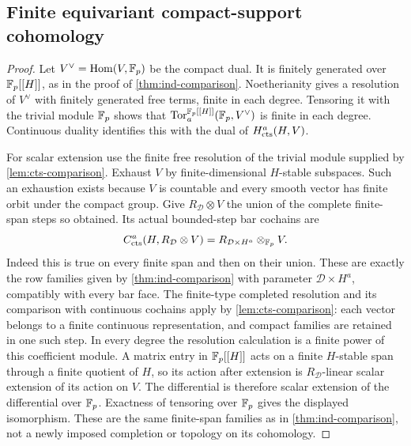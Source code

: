 \subsection{Finite equivariant compact-support cohomology}


\begin{proof}
Let $V^\vee=\operatorname{Hom}(V,\mathbb F_p)$ be the compact dual.  It is
finitely generated over $\mathbb F_p[[H]]$, as in the proof of
\cref{thm:ind-comparison}.  Noetherianity gives a resolution
of $V^\vee$ with finitely generated free terms, finite in
each degree.  Tensoring it with the trivial module $\mathbb F_p$
shows that $\operatorname{Tor}_a^{\mathbb F_p[[H]]}(\mathbb F_p,V^\vee)$ is finite in
each degree.  Continuous duality identifies this with the
dual of $H^a_{\mathrm{cts}}(H,V)$.

For scalar extension use the finite free resolution of the
trivial module supplied by \cref{lem:cts-comparison}.
Exhaust $V$ by finite-dimensional $H$-stable subspaces.
Such an exhaustion exists because
$V$ is countable and every smooth vector has finite orbit
under the compact group.  Give
$R_{\mathcal D}\otimes V$ the union of the complete
finite-span steps so obtained.  Its actual bounded-step
bar cochains are
\[
 C^a_{\mathrm{cts}}(H,R_{\mathcal D}\otimes V)
   =R_{\mathcal D\times H^a}\otimes_{\mathbb F_p}V.
\]
Indeed this is true on every finite span and then on their
union.  These are exactly the row families given by
\cref{thm:ind-comparison} with parameter
$\mathcal D\times H^a$, compatibly with every bar face.
The finite-type completed
resolution and its comparison with continuous cochains
apply by \cref{lem:cts-comparison}: each vector belongs to
a finite continuous representation, and compact families
are retained in one such step.  In every degree the
resolution calculation is a finite power of this coefficient
module.  A matrix entry in $\mathbb F_p[[H]]$ acts on a finite
$H$-stable span through a finite quotient of $H$, so its
action after extension is $R_{\mathcal D}$-linear scalar
extension of its action on $V$.  The differential is therefore
scalar extension of the differential over $\mathbb F_p$.
Exactness of tensoring over $\mathbb F_p$ gives the displayed
isomorphism.  These are the same finite-span families as
in \cref{thm:ind-comparison}, not a newly imposed completion
or topology on its cohomology.
\end{proof}

